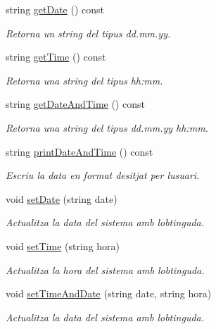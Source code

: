 \begin{DoxyCompactItemize}
\item 
string \hyperlink{class_rellotge_addfca1622b9aeba2cdff685060871153}{get\+Date} () const 
\begin{DoxyCompactList}\small\item\em Retorna un string del tipus dd.\+mm.\+yy. \end{DoxyCompactList}\item 
string \hyperlink{class_rellotge_af7a5cf18e7903db9fbaffe526fcf5a06}{get\+Time} () const 
\begin{DoxyCompactList}\small\item\em Retorna una string del tipus hh\+:mm. \end{DoxyCompactList}\item 
string \hyperlink{class_rellotge_a2ee21b1a870f7ca670e54cadeb0ee62d}{get\+Date\+And\+Time} () const 
\begin{DoxyCompactList}\small\item\em Retorna una string del tipus dd.\+mm.\+yy hh\+:mm. \end{DoxyCompactList}\item 
string \hyperlink{class_rellotge_abe2b43818a3c3283d499a4070efa6c7f}{print\+Date\+And\+Time} () const 
\begin{DoxyCompactList}\small\item\em Escriu la data en format desitjat per l\textquotesingle{}usuari. \end{DoxyCompactList}\item 
void \hyperlink{class_rellotge_a19fc5ccb1b3949979f03f207f877c059}{set\+Date} (string date)
\begin{DoxyCompactList}\small\item\em Actualitza la data del sistema amb l\textquotesingle{}obtinguda. \end{DoxyCompactList}\item 
void \hyperlink{class_rellotge_a8b4ddc7c6b02397c415a2f0ca815dc04}{set\+Time} (string hora)
\begin{DoxyCompactList}\small\item\em Actualitza la hora del sistema amb l\textquotesingle{}obtinguda. \end{DoxyCompactList}\item 
void \hyperlink{class_rellotge_a418c7be8bf66f6e27291d6b77dcd969f}{set\+Time\+And\+Date} (string date, string hora)
\begin{DoxyCompactList}\small\item\em Actualitza la data del sistema amb l\textquotesingle{}obtinguda. \end{DoxyCompactList}\item 

\end{DoxyCompactItemize}
